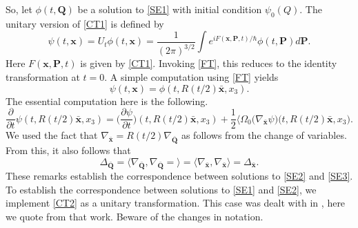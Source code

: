 \documentclass[12pt]{article}
\numberwithin{equation}{section}
\def\bP{{\boldsymbol P}}
\def\bQ{{\boldsymbol Q}}
\def\bx{{\boldsymbol x}}
\begin{document}
So, let $\phi(t,\bQ)$ be a solution to \eqref{SE1} with initial condition $\psi_0(Q).$ The unitary version of \eqref{CT1} is defined by
\begin{equation}\label{QT1}
\psi(t,\bx) =  U_t\phi(t,\bx) = \frac{1}{(2\pi)^{3/2}} \int e^{iF(\bx,\bP,t)/\hbar}\phi(t,\bP)d\bP.
\end{equation}
Here $F(\bx,\bP,t)$ is given by \eqref{CT1}. Invoking \eqref{FT}, this reduces to the identity transformation at $t=0.$  A simple computation using \eqref{FT} yields
\begin{equation}\label{QT1.1}
\psi(t,\bx) =  \phi(t,R(t/2)\bar{\bx},x_3).
\end{equation}
The essential computation here is the following.
$$\frac{\partial }{\partial t}\psi(t,R(t/2)\bar{\bx},x_3) = \big(\frac{\partial \psi}{\partial t}\big)(t,R(t/2)\bar{\bx},x_3) +\frac{1}{2}\langle\Omega_0\big(\nabla_{\bar{\bx}}\psi)\big(t,R(t/2)\bar{\bx},x_3).$$
We used the fact that $\nabla_{\bar{\bx}}=R(t/2)\nabla_{\bar{\bQ}}$ as follows from the change of variables. From this, it also follows that 
$$\Delta_{\bar{\bQ}} = \langle\nabla_{\bar{\bQ}},\nabla_{\bar{\bQ}} =  \rangle=\langle\nabla_{\bar{\bx}},\nabla_{\bar{\bx}}\rangle = \Delta_{\bar{\bx}}.$$
These remarks establish the correspondence between solutions to \eqref{SE2} and \eqref{SE3}. To establish the correspondence between solutions to \eqref{SE1} and \eqref{SE2}, we implement \eqref{CT2} as a unitary transformation.  This case was dealt with in \cite{Gz2}, here we quote from that work. Beware of the changes in notation.
\end{document}
